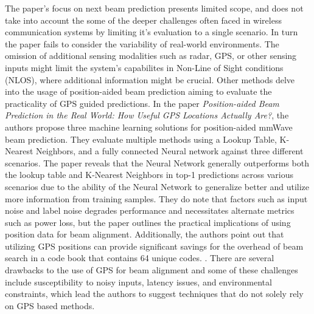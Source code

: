 The paper's focus on next beam prediction presents limited scope, and does not take into account the some of the deeper challenges often faced in wireless communication systems by limiting it's evaluation to a single scenario. In turn the paper fails to consider the variability of real-world environments. The omission of additional sensing modalities such as radar, GPS, or other sensing inputs might limit the system's capabilites in Non-Line of Sight conditions (NLOS), where additional information might be crucial. Other methods delve into the usage of position-aided beam prediction aiming to evaluate the practicality of GPS guided predictions. In the paper \textit{Position-aided Beam Prediction in the Real World: How Useful GPS Locations Actually Are?}, the authors propose three machine learning solutions for position-aided mmWave beam prediction. They evaluate multiple methods using a Lookup Table, K-Nearest Neighbors, and a fully connected Neural network against three different scenarios. The paper reveals that the Neural Network generally outperforms both the lookup table and K-Nearest Neighbors in top-1 predictions across various scenarios due to the ability of the Neural Network to generalize better and utilize more information from training samples. They do note that factors such as input noise and label noise degrades performance and necessitates alternate metrics such as power loss, but the paper outlines the practical implications of using position data for beam alignment. Additionally, the authors point out that utilizing GPS positions can provide significant savings for the overhead of beam search in a code book that contains 64 unique codes. \cite{morais2023position}. There are several drawbacks to the use of GPS for beam alignment and some of these challenges include susceptibility to noisy inputs, latency issues, and environmental constraints, which lead the authors to suggest techniques that do not solely rely on GPS based methods. 

